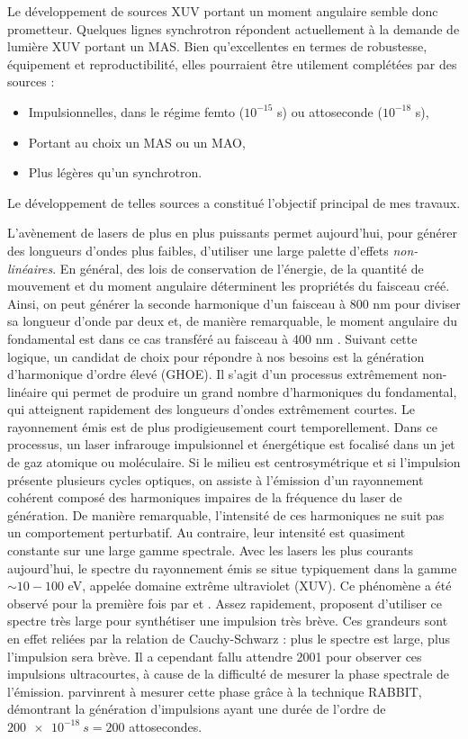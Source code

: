 Le développement de sources XUV portant un moment angulaire semble donc prometteur. Quelques lignes synchrotron répondent actuellement à la demande de lumière XUV portant un MAS. Bien qu'excellentes en termes de robustesse, équipement et reproductibilité, elles pourraient être utilement complétées par des sources :
\begin{itemize}
\renewcommand{\labelitemi}{$\bullet$}
\setlength\itemsep{1em}
\item Impulsionnelles, dans le régime femto ($10^{-15}$ s) ou attoseconde ($10^{-18}$ s),
\item Portant au choix un MAS ou un MAO,
\item Plus légères qu'un synchrotron.
\end{itemize}
Le développement de telles sources a constitué l'objectif principal de mes travaux.

L'avènement de lasers de plus en plus puissants permet aujourd'hui, pour générer des longueurs d'ondes plus faibles, d'utiliser une large palette d'effets \textit{non-linéaires}. En général, des lois de conservation de l'énergie, de la quantité de mouvement et du moment angulaire déterminent les propriétés du faisceau créé. Ainsi, on peut générer la seconde harmonique d'un faisceau à 800 nm pour diviser sa longueur d'onde par deux et, de manière remarquable, le moment angulaire du fondamental est dans ce cas transféré au faisceau à 400 nm . Suivant cette logique, un candidat de choix pour répondre à nos besoins est la génération d'harmonique d'ordre élevé (GHOE). Il s'agit d'un processus extrêmement non-linéaire qui permet de produire un grand nombre d'harmoniques du fondamental, qui atteignent rapidement des longueurs d'ondes extrêmement courtes. Le rayonnement émis est de plus prodigieusement court temporellement. Dans ce processus, un laser infrarouge impulsionnel et énergétique est focalisé dans un jet de gaz atomique ou moléculaire. Si le milieu est centrosymétrique et si l'impulsion présente plusieurs cycles optiques, on assiste à l'émission d'un rayonnement cohérent composé des harmoniques impaires de la fréquence du laser de génération. De manière remarquable, l'intensité de ces harmoniques ne suit pas un comportement perturbatif. Au contraire, leur intensité est quasiment constante sur une large gamme spectrale. Avec les lasers les plus courants aujourd'hui, le spectre du rayonnement émis se situe typiquement dans la gamme $\sim 10-100$ eV, appelée domaine extrême ultraviolet (XUV). Ce phénomène a été observé pour la première fois par  et . Assez rapidement,  proposent d'utiliser ce spectre très large pour synthétiser une impulsion très brève. Ces grandeurs sont en effet reliées par la relation de Cauchy-Schwarz : plus le spectre est large, plus l'impulsion sera brève. Il a cependant fallu attendre 2001 pour observer ces impulsions ultracourtes, à cause de la difficulté de mesurer la phase spectrale de l'émission.  parvinrent à mesurer cette phase grâce à la technique RABBIT, démontrant la génération d'impulsions ayant une durée de l'ordre de $\SI{200e-18}{s} = 200$ attosecondes. 

